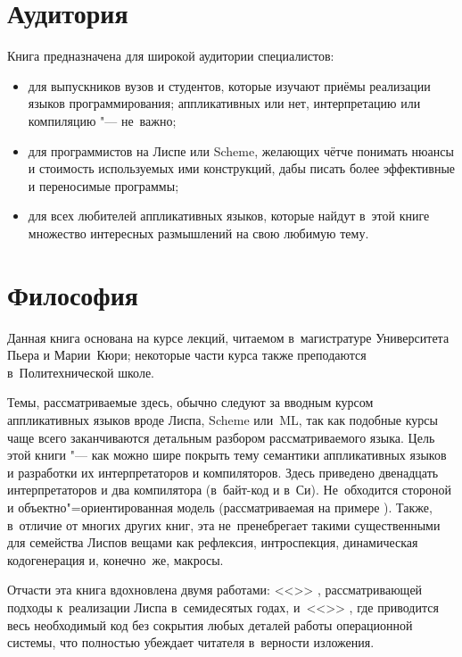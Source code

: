 \section*{Аудитория}\label{pref/sect:audience}

Книга предназначена для широкой аудитории специалистов:
\begin{itemize}
  \item для выпускников вузов и студентов, которые изучают приёмы
        реализации языков программирования; аппликативных или нет,
        интерпретацию или компиляцию "--- не~важно;

  \item для программистов на Лиспе или Scheme, желающих чётче понимать
        нюансы и стоимость используемых ими конструкций, дабы писать
        более эффективные и переносимые программы;

  \item для всех любителей аппликативных языков, которые найдут в~этой
        книге множество интересных размышлений на свою любимую тему.
\end{itemize}


\section*{Философия}\label{pref/sect:philosophy}

Данная книга основана на курсе лекций, читаемом в~магистратуре Университета
Пьера и Марии~Кюри; некоторые части курса также преподаются в~Политехнической
школе.

Темы, рассматриваемые здесь, обычно следуют за вводным курсом аппликативных
языков вроде Лиспа, Scheme или~ML, так как подобные курсы чаще всего
заканчиваются детальным разбором рассматриваемого языка. Цель этой книги "---
как можно шире покрыть тему семантики аппликативных языков и разработки их
интерпретаторов и компиляторов. Здесь приведено двенадцать интерпретаторов и
два компилятора (в~байт-код и в~Си). Не~обходится стороной и
объектно"=ориентированная модель (рассматриваемая на примере \Meroon). Также,
в~отличие от многих других книг, эта не~пренебрегает такими существенными для
семейства Лиспов вещами как рефлексия, интроспекция, динамическая кодогенерация
и, конечно~же, макросы.

Отчасти эта книга вдохновлена двумя работами: <<>>
\cite{all78}, рассматривающей подходы к~реализации Лиспа в~семидесятых годах,
и~<<>> \cite{com84}, где
приводится весь необходимый код без сокрытия любых деталей работы операционной
системы, что полностью убеждает читателя в~верности изложения.

